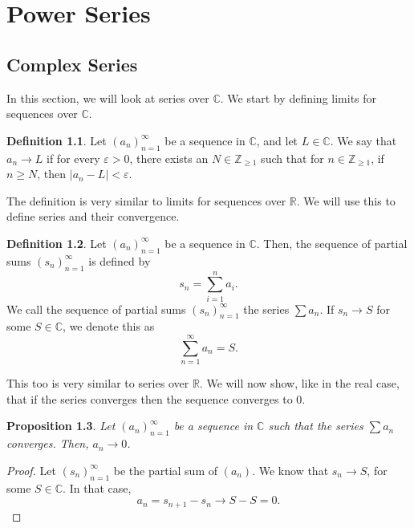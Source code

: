 \documentclass[a4paper, openany]{memoir}
\theoremstyle{definition}
\newtheorem{definition}{Definition}[section]
\theoremstyle{plain}
\newtheorem{proposition}[definition]{Proposition}
\begin{document}
\chapter{Power Series}
\section{Complex Series}
In this section, we will look at series over $\mathbb{C}$. We start by defining limits for sequences over $\mathbb{C}$.
\begin{definition}
Let $(a_n)_{n=1}^{\infty}$ be a sequence in $\mathbb{C}$, and let $L \in \mathbb{C}$. We say that $a_n \to L$ if for every $\varepsilon > 0$, there exists an $N \in \mathbb{Z}_{\geqslant 1}$ such that for $n \in \mathbb{Z}_{\geqslant 1}$, if $n \geqslant N$, then $|a_n - L| < \varepsilon$.
\end{definition}
\noindent The definition is very similar to limits for sequences over $\mathbb{R}$. We will use this to define series and their convergence.
\begin{definition}
Let $(a_n)_{n=1}^{\infty}$ be a sequence in $\mathbb{C}$. Then, the sequence of partial sums $(s_n)_{n=1}^{\infty}$ is defined by
\[s_n = \sum_{i=1}^n a_i.\]
We call the sequence of partial sums $(s_n)_{n=1}^{\infty}$ the series $\sum a_n$. If $s_n \to S$ for some $S \in \mathbb{C}$, we denote this as
\[\sum_{n=1}^{\infty} a_n = S.\]
\end{definition}
\noindent This too is very similar to series over $\mathbb{R}$. We will now show, like in the real case, that if the series converges then the sequence converges to 0.
\begin{proposition}
Let $(a_n)_{n=1}^{\infty}$ be a sequence in $\mathbb{C}$ such that the series $\sum a_n$ converges. Then, $a_n \to 0$.
\end{proposition}
\begin{proof}
Let $(s_n)_{n=1}^{\infty}$ be the partial sum of $(a_n)$. We know that $s_n \to S$, for some $S \in \mathbb{C}$. In that case,
\[a_n = s_{n+1} - s_n \to S - S = 0.\]
\end{proof}
\end{document}
